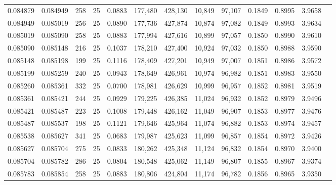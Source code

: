 \begin{tabular}{rrrrrrrrrrrrr}
0.084879 & 0.084949 &   258 &  25 &                                     0.0883 & 177,480 & 428,130 &  10,849 &  97,107 & 0.1849 & 0.8995 & 3.9658 \\
0.084949 & 0.085019 &   256 &  25 &                                     0.0890 & 177,736 & 427,874 &  10,874 &  97,082 & 0.1849 & 0.8993 & 3.9634 \\
0.085019 & 0.085090 &   258 &  25 &                                     0.0883 & 177,994 & 427,616 &  10,899 &  97,057 & 0.1850 & 0.8990 & 3.9610 \\
0.085090 & 0.085148 &   216 &  25 &                                     0.1037 & 178,210 & 427,400 &  10,924 &  97,032 & 0.1850 & 0.8988 & 3.9590 \\
0.085148 & 0.085198 &   199 &  25 &                                     0.1116 & 178,409 & 427,201 &  10,949 &  97,007 & 0.1851 & 0.8986 & 3.9572 \\
0.085199 & 0.085259 &   240 &  25 &                                     0.0943 & 178,649 & 426,961 &  10,974 &  96,982 & 0.1851 & 0.8983 & 3.9550 \\
0.085260 & 0.085361 &   332 &  25 &                                     0.0700 & 178,981 & 426,629 &  10,999 &  96,957 & 0.1852 & 0.8981 & 3.9519 \\
0.085361 & 0.085421 &   244 &  25 &                                     0.0929 & 179,225 & 426,385 &  11,024 &  96,932 & 0.1852 & 0.8979 & 3.9496 \\
0.085421 & 0.085487 &   223 &  25 &                                     0.1008 & 179,448 & 426,162 &  11,049 &  96,907 & 0.1853 & 0.8977 & 3.9476 \\
0.085487 & 0.085537 &   198 &  25 &                                     0.1121 & 179,646 & 425,964 &  11,074 &  96,882 & 0.1853 & 0.8974 & 3.9457 \\
0.085538 & 0.085627 &   341 &  25 &                                     0.0683 & 179,987 & 425,623 &  11,099 &  96,857 & 0.1854 & 0.8972 & 3.9426 \\
0.085627 & 0.085704 &   275 &  25 &                                     0.0833 & 180,262 & 425,348 &  11,124 &  96,832 & 0.1854 & 0.8970 & 3.9400 \\
0.085704 & 0.085782 &   286 &  25 &                                     0.0804 & 180,548 & 425,062 &  11,149 &  96,807 & 0.1855 & 0.8967 & 3.9374 \\
0.085783 & 0.085854 &   258 &  25 &                                     0.0883 & 180,806 & 424,804 &  11,174 &  96,782 & 0.1856 & 0.8965 & 3.9350 \\

\end{tabular}

